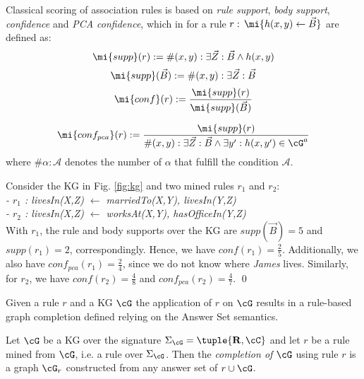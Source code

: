 Classical scoring of association rules is based on \emph{rule support}, \emph{body support}, \emph{confidence} and \emph{PCA confidence}, which in \cite{amie} for
a rule $r:\,\mi{h(x,y)\leftarrow \vec{B}}$
are defined as:
%
\begin{equation}\label{eq:supp}
\mi{supp}(r) := \#(x,y): \exists \vec{Z}: \vec{B} \wedge h(x,y)
\end{equation}
\begin{equation}\label{eq:body_supp}
\mi{supp}(\vec{B}) := \#(x,y): \exists \vec{Z}: \vec{B}
\end{equation}
\begin{equation}\label{eq:std_conf}
\mi{conf}(r) := \frac{\mi{supp}(r)}{\mi{supp}(\vec{B})}
\end{equation}

\begin{equation}\label{eq:pca_conf}
\mi{conf_{pca}}(r) := \frac{\mi{supp}(r)}{\#(x,y): \exists \vec{Z}: \vec{B} \wedge \exists y': h(x,y')\in \cG^a}
\end{equation}
where $\# \alpha : \mathcal{A}$ denotes the number of $\alpha$ that fulfill the condition $\mathcal{A}$.


\begin{example}
Consider the KG in Fig. \ref{fig:kg} and two mined rules $r_1$ and $r_2$:\\
\textit{ - $r_1$ : livesIn(X,Z) $\leftarrow$ marriedTo(X,Y), livesIn(Y,Z)}\\
\textit{ - $r_2$ : livesIn(X,Z) $\leftarrow$ worksAt(X,Y), hasOfficeIn(Y,Z)}\\
With $r_1$, the rule and body supports over the KG are $supp(\vec{B})=5$ and $supp(r_1) = 2$, correspondingly. Hence, we have $conf(r_1) = \frac{2}{5}$. Additionally, we also have $conf_{pca}(r_1) = \frac{2}{4}$, since we do not know where \textit{James} lives.  Similarly, for $r_2$, we have $conf(r_2) = \frac{4}{8}$ and $conf_{pca}(r_2) = \frac{4}{7}$. \qed
\end{example}



Given a rule $r$ and a KG $\cG$ the application of $r$ on $\cG$ results in a rule-based graph completion defined relying on the Answer Set semantics.

\begin{definition}\label{def:graphcompl}
Let $\cG$ be a KG over the signature $\Sigma_{\cG}=\tuple{\mathbf{R},\cC}$ and let $r$ be a rule %
mined from $\cG$, i.e. a rule over $\Sigma_{\cG}$.
Then the \emph{completion of $\cG$} using rule $r$ is a graph $\cG_{r}$ constructed from any answer set of $r \cup \cG$. 
\end{definition}

